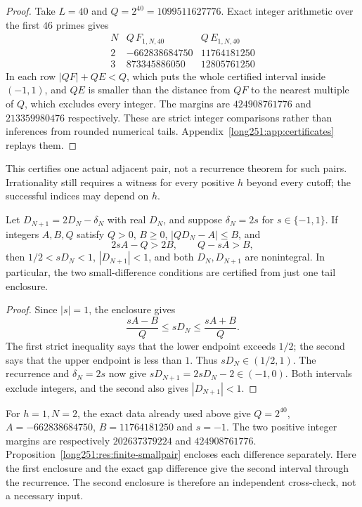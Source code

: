 \documentclass[11pt]{article}
\begin{document}
\begin{proof}
Take $L=40$ and $Q=2^{40}=1099511627776$.  Exact integer arithmetic over the
first $46$ primes gives
\[
\begin{array}{c|r|r}
 N&Q\,F_{1,N,40}&Q\,E_{1,N,40}\\\hline
 2&-662838684750&11764181250\\
 3& 873345886050&12805761250
\end{array}
\]
In each row $|QF|+QE<Q$, which puts the whole certified interval inside
$(-1,1)$, and $QE$ is smaller than the distance from $QF$ to the nearest
multiple of $Q$, which excludes every integer.  The margins are $424908761776$
and $213359980476$ respectively.  These are strict integer comparisons rather
than inferences from rounded numerical tails.
Appendix~\ref{long251:app:certificates} replays them.
\end{proof}

This certifies one actual adjacent pair, not a recurrence theorem for
such pairs.  Irrationality still requires a witness for every positive
$h$ beyond every cutoff; the successful indices may depend on $h$.

\begin{proposition}\label{long251:res:one-tail-certificate}
Let $D_{N+1}=2D_N-\delta_N$ with real $D_N$, and suppose
$\delta_N=2s$ for $s\in\{-1,1\}$.  If integers $A,B,Q$ satisfy
$Q>0$, $B\ge0$, $|QD_N-A|\le B$, and
\[
 2sA-Q>2B,\qquad Q-sA>B,
\]
then $1/2<sD_N<1$, $|D_{N+1}|<1$, and both $D_N,D_{N+1}$ are
nonintegral.  In particular, the two small-difference conditions are certified from
just one tail enclosure.
\end{proposition}
\begin{proof}
Since $|s|=1$, the enclosure gives
\[
 \frac{sA-B}{Q}\le sD_N\le\frac{sA+B}{Q}.
\]
The first strict inequality says that the lower endpoint exceeds $1/2$;
the second says that the upper endpoint is less than $1$.
Thus $sD_N\in(1/2,1)$.  The recurrence and $\delta_N=2s$ now give
$sD_{N+1}=2sD_N-2\in(-1,0)$.  Both intervals exclude integers, and
the second also gives $|D_{N+1}|<1$.
\end{proof}
For $h=1,N=2$, the exact data already used above give
$Q=2^{40}$, $A=-662838684750$, $B=11764181250$ and $s=-1$.
The two positive integer margins are respectively
$202637379224$ and $424908761776$.
Proposition~\ref{long251:res:finite-smallpair} encloses each difference
separately.  Here the first enclosure and the exact gap difference give
the second interval through the recurrence.  The second enclosure is
therefore an independent cross-check, not a necessary input.
\end{document}
